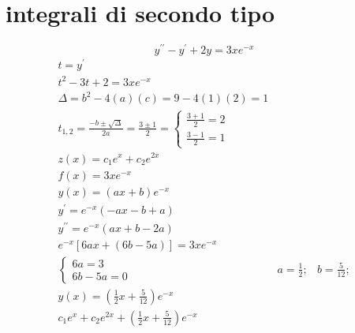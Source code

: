 \documentclass{article}
\begin{document}
\section{integrali di secondo tipo}
\begin{equation*}
	y^{\prime\prime}-y^\prime+2y=3xe^{-x}
\end{equation*}
\begin{equation*}
	\begin{matrix}
		t=y^\prime \\
		t^2-3t+2=3xe^{-x} \\
		\Delta=b^2-4(a)(c)=9-4(1)(2)=1 \\
		t_{1,2}=\frac{-b\pm\sqrt{\Delta}}{2a}=\frac{3\pm{1}}{2}=\begin{cases}
			\frac{3+{1}}{2}=2 \\
			\frac{3-{1}}{2}=1
		\end{cases}\\
		z(x)=c_1e^x+c_2e^{2x}\\
		f(x)=3xe^{-x}\\
		y(x)=(ax+b)e^{-x}\\
		y^\prime=e^{-x}(-ax-b+a)\\
		y^{\prime\prime}=e^{-x}(ax+b-2a)\\
		e^{-x}[6ax+(6b-5a)]=3xe^{-x}\\
		\begin{cases}
			6a=3\\
			6b-5a=0
		\end{cases}&a=\frac{1}{2};&b=\frac{5}{12};\\
		y(x)=\left(\frac{1}{2}x+\frac{5}{12}\right)e^{-x}\\
		c_1e^x+c_2e^{2x}+\left(\frac{1}{2}x+\frac{5}{12}\right)e^{-x}
	\end{matrix}
\end{equation*}
\end{document}
